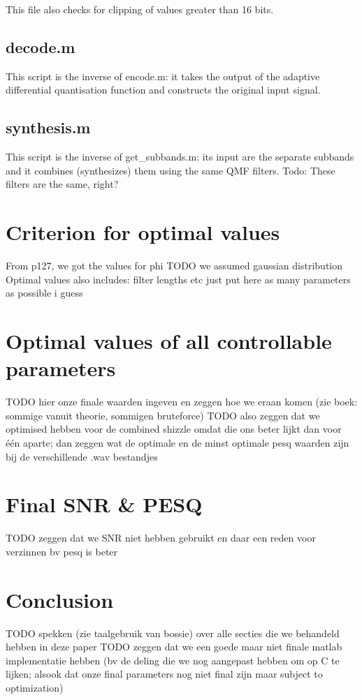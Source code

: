 \documentclass[a4paper]{article}
\begin{document}
This file also checks for clipping of values greater than 16 bits.

\subsection{decode.m}
This script is the inverse of encode.m: it takes the output of the adaptive differential quantisation function and constructs the original input signal.

\subsection{synthesis.m}
This script is the inverse of get\_subbands.m: its input are the separate subbands and it combines (synthesizes) them using the same QMF filters. Todo: These filters are the same, right?

\section{Criterion for optimal values}
From p127, we got the values for phi TODO we assumed gaussian distribution
Optimal values also includes: filter lengths etc just put here as many parameters as possible i guess

\section{Optimal values of all controllable parameters}
TODO hier onze finale waarden ingeven en zeggen hoe we eraan komen (zie boek: sommige vanuit theorie, sommigen bruteforce)
TODO also zeggen dat we optimised hebben voor de combined shizzle omdat die ons beter lijkt dan voor één aparte; dan zeggen wat de optimale en de minst optimale pesq waarden zijn bij de verschillende .wav bestandjes

\section{Final SNR \& PESQ}
TODO zeggen dat we SNR niet hebben gebruikt en daar een reden voor verzinnen bv pesq is beter

\section{Conclusion}
TODO spekken (zie taalgebruik van bossie) over alle secties die we behandeld hebben in deze paper
TODO zeggen dat we een goede maar niet finale matlab implementatie hebben (bv de deling die we nog aangepast hebben om op C te lijken; alsook dat onze final parameters nog niet final zijn maar subject to optimization)
\end{document}

